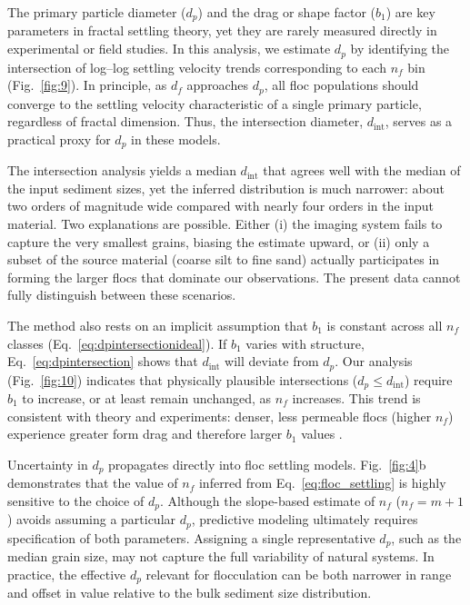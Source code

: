 \documentclass{agujournal2019}
\begin{document}
The primary particle diameter ($d_p$) and the drag or shape factor ($b_1$) are key parameters in fractal settling theory, yet they are rarely measured directly in experimental or field studies. In this analysis, we estimate $d_p$ by identifying the intersection of log--log settling velocity trends corresponding to each $n_f$ bin (Fig.~\ref{fig:9}). In principle, as $d_f$ approaches $d_p$, all floc populations should converge to the settling velocity characteristic of a single primary particle, regardless of fractal dimension. Thus, the intersection diameter, $d_{\text{int}}$, serves as a practical proxy for $d_p$ in these models.

The intersection analysis yields a median $d_{\text{int}}$ that agrees well with the median of the input sediment sizes, yet the inferred distribution is much narrower: about two orders of magnitude wide compared with nearly four orders in the input material.  Two explanations are possible.  Either (i) the imaging system fails to capture the very smallest grains, biasing the estimate upward, or (ii) only a subset of the source material (coarse silt to fine sand) actually participates in forming the larger flocs that dominate our observations.  The present data cannot fully distinguish between these scenarios.

The method also rests on an implicit assumption that $b_1$ is constant across all $n_f$ classes (Eq.~\eqref{eq:dpintersectionideal}).  If $b_1$ varies with structure, Eq.~\eqref{eq:dpintersection} shows that $d_{\text{int}}$ will deviate from $d_p$.  Our analysis (Fig.~\ref{fig:10}) indicates that physically plausible intersections ($d_p \le d_{\text{int}}$) require $b_1$ to increase, or at least remain unchanged, as $n_f$ increases.  This trend is consistent with theory and experiments: denser, less permeable flocs (higher $n_f$) experience greater form drag and therefore larger $b_1$ values \cite{strom2011explicit}.

Uncertainty in $d_p$ propagates directly into floc settling models. Fig.~\ref{fig:4}b demonstrates that the value of $n_f$ inferred from Eq.~\eqref{eq:floc_settling} is highly sensitive to the choice of $d_p$. Although the slope-based estimate of $n_f$ ($n_f = m + 1$) avoids assuming a particular $d_p$, predictive modeling ultimately requires specification of both parameters. Assigning a single representative $d_p$, such as the median grain size, may not capture the full variability of natural systems. In practice, the effective $d_p$ relevant for flocculation can be both narrower in range and offset in value relative to the bulk sediment size distribution.
\end{document}
